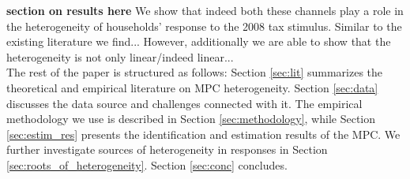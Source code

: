 \textbf{section on results here}
We show that indeed both these channels play a role in the heterogeneity of households' response to the 2008 tax stimulus. Similar to the existing literature we find... However, additionally we are able to show that the heterogeneity is not only linear/indeed linear... \\ 
The rest of the paper is structured as follows: Section \ref{sec:lit} summarizes the theoretical and empirical literature on MPC heterogeneity. Section \ref{sec:data} discusses the data source and challenges connected with it. The empirical methodology we use is described in Section \ref{sec:methodology}, while Section \ref{sec:estim_res} presents the identification and estimation results of the MPC. We further investigate sources of heterogeneity in responses in Section \ref{sec:roots_of_heterogeneity}. Section \ref{sec:conc} concludes.
